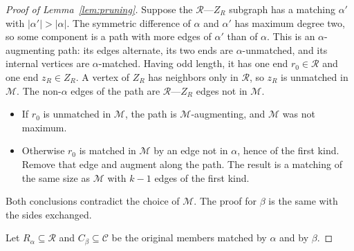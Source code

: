 \documentclass[11pt]{article}
\theoremstyle{remark}
\newcommand{\abs}[1]{\lvert #1\rvert}
\begin{document}
\begin{proof}[Proof of Lemma~\ref{lem:pruning}]
Suppose the $\mathcal R$---$Z_R$ subgraph has a matching $\alpha'$ with
$\abs{\alpha'}>\abs\alpha$.  The symmetric difference of $\alpha$ and
$\alpha'$ has maximum degree two, so some component is a path with more
edges of $\alpha'$ than of $\alpha$.  This is an $\alpha$-augmenting path:
its edges alternate, its two ends are $\alpha$-unmatched, and its internal
vertices are $\alpha$-matched.  Having odd length, it has one end
$r_0\in\mathcal R$ and one end $z_R\in Z_R$.  A vertex of $Z_R$ has
neighbors only in $\mathcal R$, so $z_R$ is unmatched in $\mathcal M$.  The
non-$\alpha$ edges of the path are $\mathcal R$---$Z_R$ edges not in
$\mathcal M$.
\begin{itemize}[nosep]
\item If $r_0$ is unmatched in $\mathcal M$, the path is
 $\mathcal M$-augmenting, and $\mathcal M$ was not maximum.
\item Otherwise $r_0$ is matched in $\mathcal M$ by an edge not in $\alpha$,
 hence of the first kind.  Remove that edge and augment along the path.
 The result is a matching of the same size as $\mathcal M$ with $k-1$
 edges of the first kind.
\end{itemize}
Both conclusions contradict the choice of $\mathcal M$.  The proof for
$\beta$ is the same with the sides exchanged.

Let $R_\alpha\subseteq\mathcal R$ and $C_\beta\subseteq\mathcal C$ be the
original members matched by $\alpha$ and by $\beta$.


\end{proof}
\end{document}
